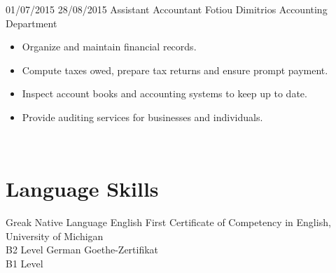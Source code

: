 \documentclass[letterpaper]{engineer_cv} %
\begin{document}
	\begin{longList} %
		\longListItem
			{01/07/2015}
			{28/08/2015}
			{Assistant Accountant}
			{Fotiou Dimitrios Accounting Department}
			{}
			{\begin{itemize}
				\item Organize and maintain financial records.
				\item Compute taxes owed, prepare tax returns and ensure prompt payment.
                \item Inspect account books and accounting systems to keep up to date.
                \item Provide auditing services for businesses and individuals.
			\end{itemize}}
			\\
        \end{longList}


	\section{Language Skills}

	\begin{longList} %
		\longListItem
			{Greak}
			{}
			{Native Language}
			{}
			{}
			{}
		\longListItem
			{English}
			{}
			{First Certificate of Competency in English, University of Michigan}
			{\\B2 Level}
			{}
			{}
		\longListItem
			{German}
			{}
			{Goethe-Zertifikat}
			{\\B1 Level}
			{}
			{}
	\end{longList}


        \clearpage

	\infographics


\end{document}
